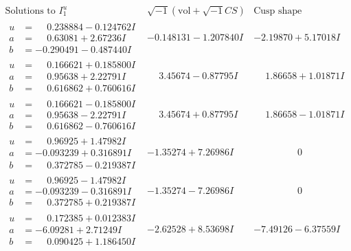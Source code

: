 \documentclass[1p]{elsarticle_modified}
\theoremstyle{definition}
\newcommand{\I}{\sqrt{-1}}
\begin{document}
$$\begin{array}{c|c|c}
\text{Solutions to }I^u_{1}& \I (\text{vol} + \sqrt{-1}CS) & \text{Cusp shape}\\
 \hline 
\begin{aligned}
u &= \phantom{-}0.238884 - 0.124762 I \\
a &= \phantom{-}0.63081 + 2.67236 I \\
b &= -0.290491 - 0.487440 I\end{aligned}
 & -0.148131 - 1.207840 I & -2.19870 + 5.17018 I \\ \hline\begin{aligned}
u &= \phantom{-}0.166621 + 0.185800 I \\
a &= \phantom{-}0.95638 + 2.22791 I \\
b &= \phantom{-}0.616862 + 0.760616 I\end{aligned}
 & \phantom{-}3.45674 - 0.87795 I & \phantom{-}1.86658 + 1.01871 I \\ \hline\begin{aligned}
u &= \phantom{-}0.166621 - 0.185800 I \\
a &= \phantom{-}0.95638 - 2.22791 I \\
b &= \phantom{-}0.616862 - 0.760616 I\end{aligned}
 & \phantom{-}3.45674 + 0.87795 I & \phantom{-}1.86658 - 1.01871 I \\ \hline\begin{aligned}
u &= \phantom{-}0.96925 + 1.47982 I \\
a &= -0.093239 + 0.316891 I \\
b &= \phantom{-}0.372785 - 0.219387 I\end{aligned}
 & -1.35274 + 7.26986 I & \phantom{-0.000000 } 0 \\ \hline\begin{aligned}
u &= \phantom{-}0.96925 - 1.47982 I \\
a &= -0.093239 - 0.316891 I \\
b &= \phantom{-}0.372785 + 0.219387 I\end{aligned}
 & -1.35274 - 7.26986 I & \phantom{-0.000000 } 0 \\ \hline\begin{aligned}
u &= \phantom{-}0.172385 + 0.012383 I \\
a &= -6.09281 + 2.71249 I \\
b &= \phantom{-}0.090425 + 1.186450 I\end{aligned}
 & -2.62528 + 8.53698 I & -7.49126 - 6.37559 I \\ \hline\begin{aligned}

\end{aligned}
\end{array}$$
\end{document}
